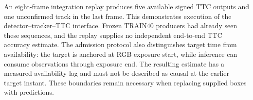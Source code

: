 An eight-frame integration replay produces five available signed TTC outputs and one unconfirmed track in the last frame. This demonstrates execution of the detector--tracker--TTC interface. Frozen TRAIN40 producers had already seen these sequences, and the replay supplies no independent end-to-end TTC accuracy estimate. The admission protocol also distinguishes target time from availability: the target is anchored at RGB exposure start, while inference can consume observations through exposure end. The resulting estimate has a measured availability lag and must not be described as causal at the earlier target instant. These boundaries remain necessary when replacing supplied boxes with predictions. 
\FloatBarrier

